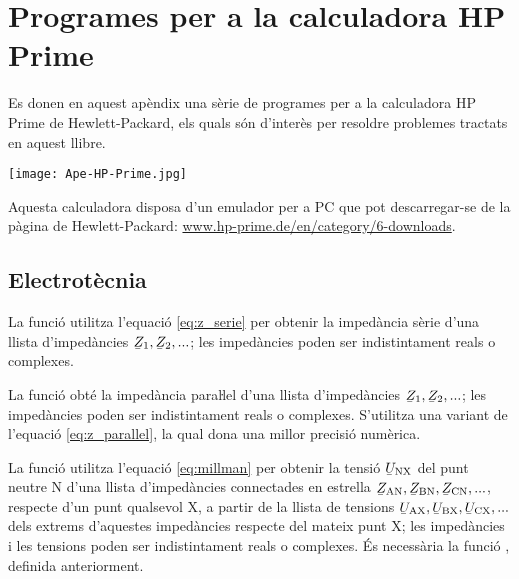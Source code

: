 \chapter{Programes per a la calculadora \textsf{HP Prime}}\label{sec:progs-HP}

\lstset{
	language=HPPRIME,
	numbers=left,
	frame=lines
}

Es donen en aquest apèndix una sèrie de programes per a la calculadora \textsf{HP Prime} de Hewlett-Packard, els quals són d'interès per resoldre problemes tractats en aquest llibre.

\begin{center}
\texttt{[image: Ape-HP-Prime.jpg]}
\end{center}

Aquesta calculadora disposa d'un emulador per a PC que pot descarregar-se de la pàgina de Hewlett-Packard: \href{http://www.hp-prime.de/en/category/6-downloads}{www.hp-prime.de/en/category/6-downloads}.


\section{Electrotècnia}\label{sec:HP_ELC}

La funció  utilitza l'equació \eqref{eq:z_serie} per obtenir la impedància sèrie d'una llista d'impedàncies $\cmplx{Z}_1, \cmplx{Z}_2, ...$; les impedàncies poden ser indistintament reals o complexes.




La funció  obté la impedància paraŀlel  d'una llista d'impedàncies $\cmplx{Z}_1, \cmplx{Z}_2, ...$; les impedàncies poden ser indistintament reals o complexes. S'utilitza una variant de l'equació \eqref{eq:z_parallel}, la qual dona una millor precisió numèrica.




La funció  utilitza l'equació \eqref{eq:millman} per obtenir la tensió $\cmplx{U}\ped{NX}$ del punt neutre N d'una llista d'impedàncies connectades en estrella $\cmplx{Z}\ped{AN}, \cmplx{Z}\ped{BN}, \cmplx{Z}\ped{CN}, ...$, respecte d'un punt qualsevol X, a partir de la llista de tensions $\cmplx{U}\ped{AX}, \cmplx{U}\ped{BX}, \cmplx{U}\ped{CX}, ...$ dels extrems d'aquestes impedàncies respecte del mateix punt X; les impedàncies i les tensions poden ser indistintament reals o complexes. És necessària la funció , definida anteriorment.

